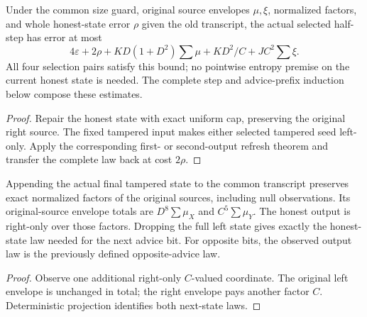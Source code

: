 \begin{theorem}
  \label{thm:lowerbounds-algebraic-flipflop-preservation-half}
  \leanok
  Under the common size guard, original source envelopes $\mu,\xi$,
  normalized factors, and whole honest-state error $\rho$ given the old
  transcript, the actual selected half-step has error at most
  \[
    4\varepsilon+2\rho+KD(1+D^2)\sum\mu+KD^2/C+JC^2\sum\xi.
  \]
  All four selection pairs satisfy this bound; no pointwise entropy
  premise on the current honest state is needed. The complete step and
  advice-prefix induction below compose these estimates.
\end{theorem}
\begin{proof}
  \leanok
  Repair the honest state with exact uniform cap, preserving the original
  right source. The fixed tampered input makes either selected tampered
  seed left-only. Apply the corresponding first- or second-output refresh
  theorem and transfer the complete law back at cost $2\rho$.
\end{proof}

\begin{theorem}
  \label{thm:lowerbounds-algebraic-flipflop-observed}
  \leanok
  Appending the actual final tampered state to the common transcript
  preserves exact normalized factors of the original sources, including
  null observations. Its original-source envelope totals are
  $D^8\sum\mu_X$ and $C^5\sum\mu_Y$. The honest output is right-only
  over those factors. Dropping the full left state gives exactly the
  honest-state law needed for the next advice bit. For opposite bits,
  the observed output law is the previously defined opposite-advice law.
\end{theorem}
\begin{proof}
  \leanok
  Observe one additional right-only $C$-valued coordinate. The original
  left envelope is unchanged in total; the right envelope pays another
  factor $C$. Deterministic projection identifies both next-state laws.
\end{proof}

